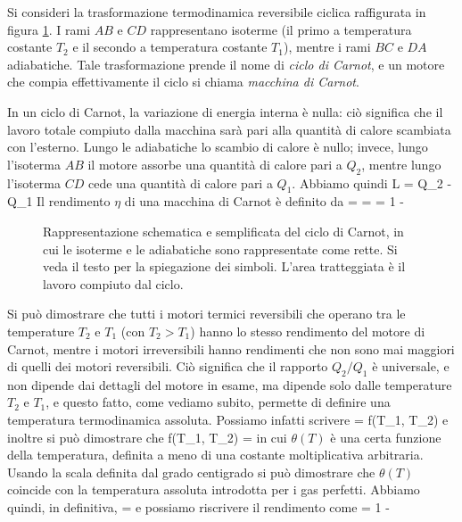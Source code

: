 Si consideri la trasformazione termodinamica reversibile ciclica raffigurata in figura \ref{fig:carnot}. I rami $AB$ e $CD$ rappresentano isoterme (il primo a temperatura costante $T_{2}$ e il secondo a temperatura costante $T_{1}$), mentre i rami $BC$ e $DA$ adiabatiche. Tale trasformazione prende il nome di {\em ciclo di Carnot}, e un motore che compia effettivamente il ciclo si chiama {\em macchina di Carnot}.

In un ciclo di Carnot, la variazione di energia interna è nulla: ciò significa che il lavoro totale compiuto dalla macchina sarà pari alla quantità di calore scambiata con l'esterno. Lungo le adiabatiche lo scambio di calore è nullo; invece, lungo l'isoterma $AB$ il motore assorbe una quantità di calore pari a $Q_{2}$, mentre lungo l'isoterma $CD$ cede una quantità di calore pari a $Q_{1}$. Abbiamo quindi
%
\be
\label{eq:lavoro-carnot}
L = Q_{2} - Q_{1}
\ee
%
Il rendimento $\eta$ di una macchina di Carnot è definito da
%
\be
\label{eq:etaQ}
\eta =  =  = 1 - 
\ee
%
\begin{figure}[!ht]
	\centering
{}
	\caption{Rappresentazione schematica e semplificata del ciclo di Carnot, in cui le isoterme e le adiabatiche sono rappresentate come rette. Si veda il testo per la spiegazione dei simboli. L'area tratteggiata è il lavoro compiuto dal ciclo.}
	\label{fig:carnot}
\end{figure}
Si può dimostrare che tutti i motori termici reversibili che operano tra le temperature $T_{2}$ e $T_{1}$ (con $T_{2}>T_{1}$) hanno lo stesso rendimento del motore di Carnot, mentre i motori irreversibili hanno rendimenti che non sono mai maggiori di quelli dei motori reversibili. Ciò significa che il rapporto $Q_{2}/Q_{1}$ è universale, e non dipende dai dettagli del motore in esame, ma dipende solo dalle temperature $T_{2}$ e $T_{1}$, e questo fatto, come vediamo subito, permette di definire una temperatura termodinamica assoluta. Possiamo infatti scrivere
\be
{} = f(T_{1}, T_{2})
\ee
e inoltre si può dimostrare che
\be
\label{eq:ft1t2}
f(T_{1}, T_{2}) = 
\ee
in cui $\theta(T)$ è una certa funzione della temperatura, definita a meno di una costante moltiplicativa arbitraria. Usando la scala definita dal grado centigrado si può dimostrare che $\theta(T)$ coincide con la temperatura assoluta introdotta per i gas perfetti. Abbiamo quindi, in definitiva,
\be
{} = 
\ee
e possiamo riscrivere il rendimento come
\be
\eta = 1 - 
\ee

